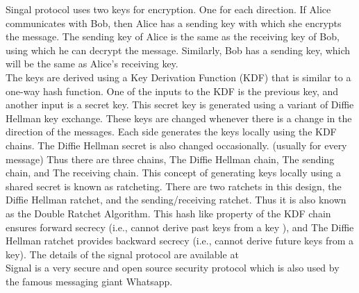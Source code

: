 \documentclass[11pt, conference, a4paper]{IEEEtran}
\begin{document}
Singal protocol uses two keys for encryption. One for each direction. If Alice communicates with Bob, then Alice has a sending key with which she encrypts the message. The sending key of Alice is the same as the receiving key of Bob, using which he can decrypt
the message. Similarly, Bob has a sending key, which will be the same as Alice's receiving key. \\ 
The keys are derived using a Key Derivation Function (KDF) that is similar to a one-way hash function. One of the inputs to the KDF is the previous key, and another input is a secret key. This secret key is generated using a variant of Diffie Hellman key exchange. 
These keys are changed whenever there is a change in the direction of the messages. Each side generates the keys locally using the KDF chains. The Diffie Hellman secret is also changed occasionally. (usually for every message) Thus there are three chains, The Diffie Hellman chain, The sending chain, and The receiving chain. This concept of generating keys locally using a shared secret is known as ratcheting. There are two ratchets in this design, the Diffie Hellman ratchet, and the sending/receiving ratchet. Thus it is also known as the Double Ratchet Algorithm. This hash like property of the KDF chain ensures forward secrecy (i.e., cannot derive past keys from a key ), and The Diffie Hellman ratchet provides backward secrecy (i.e., cannot derive future keys from a key).
The details of the signal protocol are available at \cite{signalDoc} \\
Signal is a very secure and open source security protocol which is also used by the famous messaging giant Whatsapp.      
\end{document}
